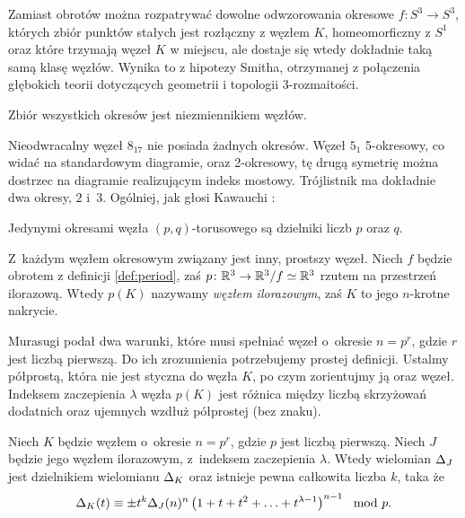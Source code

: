 Zamiast obrotów można rozpatrywać dowolne odwzorowania okresowe $f \colon S^3 \to S^3$, których zbiór punktów stałych jest rozłączny z węzłem $K$, homeomorficzny z $S^1$ oraz które trzymają węzeł $K$ w miejscu, ale dostaje się wtedy dokładnie taką samą klasę węzłów.
Wynika to z hipotezy Smitha, otrzymanej z połączenia głębokich teorii dotyczących geometrii i topologii 3-rozmaitości.

\begin{proposition}
    Zbiór wszystkich okresów jest niezmiennikiem węzłów.
\end{proposition}

Nieodwracalny węzeł $8_{17}$ nie posiada żadnych okresów.
Węzeł $5_1$ 5-okresowy, co widać na standardowym diagramie, oraz 2-okresowy, tę drugą symetrię można dostrzec na diagramie realizującym indeks mostowy.
Trójlistnik ma dokładnie dwa okresy, $2$ i~$3$.
Ogólniej, jak głosi Kawauchi \cite[ćwiczenie 10.1.9]{kawauchi96}:

\begin{proposition}
    Jedynymi okresami węzła $(p, q)$-torusowego są dzielniki liczb $p$ oraz $q$.
\end{proposition}

Z~każdym węzłem okresowym związany jest inny, prostszy węzeł.
Niech $f$ będzie obrotem z definicji \ref{def:period}, zaś $p \colon \mathbb R^3 \to \mathbb R^3/f \simeq \mathbb R^3$ rzutem na przestrzeń ilorazową.
Wtedy $p(K)$ nazywamy \emph{węzłem ilorazowym}, zaś $K$ to jego $n$-krotne nakrycie.

Murasugi podał dwa warunki, które musi spełniać węzeł o~okresie $n = p^r$, gdzie $r$ jest liczbą pierwszą.
Do ich zrozumienia potrzebujemy prostej definicji.
Ustalmy półprostą, która nie jest styczna do węzła $K$, po czym zorientujmy ją oraz węzeł.
Indeksem zaczepienia $\lambda$ węzła $p(K)$ jest różnica między liczbą skrzyżowań dodatnich oraz ujemnych wzdłuż półprostej (bez znaku).

\begin{proposition}
    \label{prp:murasugi_periodic}
    Niech $K$ będzie węzłem o~okresie $n = p^r$, gdzie $p$ jest liczbą pierwszą.
    Niech $J$ będzie jego węzłem ilorazowym, z~indeksem zaczepienia $\lambda$.
    Wtedy wielomian $\Delta_J$ jest dzielnikiem wielomianu $\Delta_K$ oraz istnieje pewna całkowita liczba $k$, taka że
    \begin{equation}
        \Delta_K(t) \equiv \pm t^k \Delta_J(n)^n \left(1 + t + t^2 + \ldots + t^{\lambda - 1}\right)^{n-1} \mod p.
    \end{equation}
\end{proposition}

